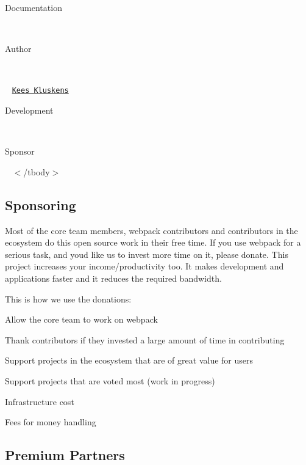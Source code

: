 Documentation

~\newline
 

Author

\href{https://leanpub.com/survivejs-webpack}{\tt } ~\newline
  

 ~\newline
 \href{https://github.com/spacek33z}{\tt Kees Kluskens} 

Development

~\newline
 

Sponsor

\href{https://codeyellow.nl/}{\tt } ~\newline
   $<$/tbody$>$ 

\subsection*{Sponsoring}

Most of the core team members, webpack contributors and contributors in the ecosystem do this open source work in their free time. If you use webpack for a serious task, and you\textquotesingle{}d like us to invest more time on it, please donate. This project increases your income/productivity too. It makes development and applications faster and it reduces the required bandwidth.

This is how we use the donations\+:


\begin{DoxyItemize}
\item Allow the core team to work on webpack
\item Thank contributors if they invested a large amount of time in contributing
\item Support projects in the ecosystem that are of great value for users
\item Support projects that are voted most (work in progress)
\item Infrastructure cost
\item Fees for money handling
\end{DoxyItemize}

\subsection*{Premium Partners}

\href{https://www.ag-grid.com/?utm_source=webpack&utm_medium=banner&utm_campaign=sponsorship}{\tt }

